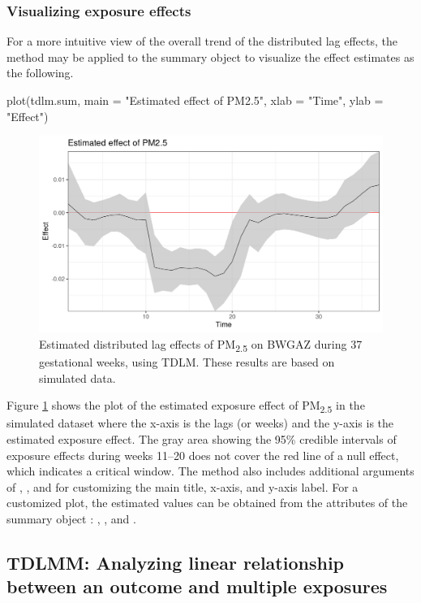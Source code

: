 \subsubsection{Visualizing exposure effects}
For a more intuitive view of the overall trend of the distributed lag effects, the  method may be applied to the summary object  to visualize the effect estimates as the following.
\begin{example}
plot(tdlm.sum, main = "Estimated effect of PM2.5", xlab = "Time", ylab = "Effect")
\end{example}
\begin{figure}[ht]
    \centering
    \includegraphics[width=130mm]{images/TDLM_pm.png}
    \caption{Estimated distributed lag effects of PM\textsubscript{2.5} on BWGAZ during 37 gestational weeks, using TDLM. These results are based on simulated data.}
    \label{fig:tdlm}
\end{figure}
Figure \ref{fig:tdlm} shows the plot of the estimated exposure effect of PM\textsubscript{2.5} in the simulated dataset where the x-axis is the lags (or weeks) and the y-axis is the estimated exposure effect. The gray area showing the 95\% credible intervals of exposure effects during weeks 11--20 does not cover the red line of a null effect, which indicates a critical window. The  method also includes additional arguments of , , and  for customizing the main title, x-axis, and y-axis label. For a customized plot, the estimated values can be obtained from the attributes of the summary object : , , and .

\subsection{TDLMM: Analyzing linear relationship between an outcome and multiple exposures}\label{ex_tdlmm}
